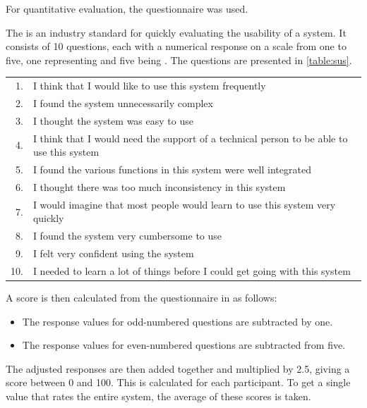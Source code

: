 For quantitative evaluation, the  questionnaire was used.

The  is an industry standard for quickly evaluating the usability of a system. It consists of 10 questions, each with a numerical response on a scale from one to five, one representing  and five being . The questions are presented in \autoref{table:sus}.~\cite{Sus}

\begin{table}[htb]
\centering
\begin{tabular}{r>{\raggedright\arraybackslash}p{11.5cm}}
\toprule
1. & I think that I would like to use this system frequently \\
2. & I found the system unnecessarily complex \\
3. & I thought the system was easy to use \\
4. & I think that I would need the support of a technical person to be able to use this system \\
5. & I found the various functions in this system were well integrated \\
6. & I thought there was too much inconsistency in this system \\
7. & I would imagine that most people would learn to use this system very quickly \\
8. & I found the system very cumbersome to use \\
9. & I felt very confident using the system \\
10. &  I needed to learn a lot of things before I could get going with this system \\
\bottomrule
\end{tabular}
\label{table:sus}
\end{table}

A score is then calculated from the  questionnaire in as follows:
\begin{itemize}[label=\rectanglebullet]
    \item The response values for odd-numbered questions are subtracted by one.
    \item The response values for even-numbered questions are subtracted from five.
\end{itemize}
The adjusted responses are then added together and multiplied by 2.5, giving a score between 0 and 100. This is calculated for each participant. To get a single value that rates the entire system, the average of these scores is taken.~\cite{Sauro2011}

